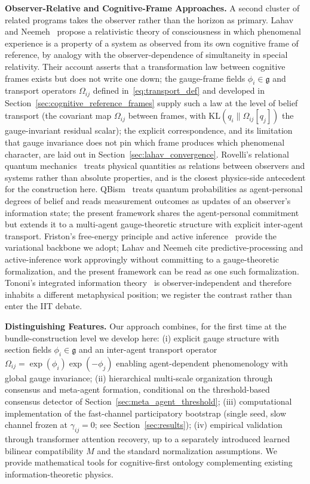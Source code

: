 \documentclass[11pt]{article}
\begin{document}
\textbf{Observer-Relative and Cognitive-Frame Approaches.} A second cluster of related programs takes the observer rather than the horizon as primary. Lahav and Neemeh~\cite{LahavNeemeh2022, LahavNeemeh2025} propose a relativistic theory of consciousness in which phenomenal experience is a property of a system as observed from its own cognitive frame of reference, by analogy with the observer-dependence of simultaneity in special relativity. Their account asserts that a transformation law between cognitive frames exists but does not write one down; the gauge-frame fields $\phi_i \in \mathfrak{g}$ and transport operators $\Omega_{ij}$ defined in~\eqref{eq:transport_def} and developed in Section~\ref{sec:cognitive_reference_frames} supply such a law at the level of belief transport (the covariant map $\Omega_{ij}$ between frames, with $\mathrm{KL}(q_i \| \Omega_{ij}[q_j])$ the gauge-invariant residual scalar); the explicit correspondence, and its limitation that gauge invariance does not pin which frame produces which phenomenal character, are laid out in Section~\ref{sec:lahav_convergence}. Rovelli's relational quantum mechanics~\cite{Rovelli1996} treats physical quantities as relations between observers and systems rather than absolute properties, and is the closest physics-side antecedent for the construction here. QBism~\cite{Fuchs2014} treats quantum probabilities as agent-personal degrees of belief and reads measurement outcomes as updates of an observer's information state; the present framework shares the agent-personal commitment but extends it to a multi-agent gauge-theoretic structure with explicit inter-agent transport. Friston's free-energy principle and active inference~\cite{Friston2010, Friston2017, parr2022active} provide the variational backbone we adopt; Lahav and Neemeh cite predictive-processing and active-inference work approvingly without committing to a gauge-theoretic formalization, and the present framework can be read as one such formalization. Tononi's integrated information theory~\cite{Tononi2008, Tononi2016} is observer-independent and therefore inhabits a different metaphysical position; we register the contrast rather than enter the IIT debate.

\textbf{Distinguishing Features.} Our approach combines, for the first time at the bundle-construction level we develop here: (i) explicit gauge structure with section fields $\phi_i \in \mathfrak{g}$ and an inter-agent transport operator $\Omega_{ij} = \exp(\phi_i)\exp(-\phi_j)$ enabling agent-dependent phenomenology with global gauge invariance; (ii) hierarchical multi-scale organization through consensus and meta-agent formation, conditional on the threshold-based consensus detector of Section~\ref{sec:meta_agent_threshold}; (iii) computational implementation of the fast-channel participatory bootstrap (single seed, slow channel frozen at $\gamma_{ij} = 0$; see Section~\ref{sec:results}); (iv) empirical validation through transformer attention recovery, up to a separately introduced learned bilinear compatibility $M$ and the standard normalization assumptions. We provide mathematical tools for cognitive-first ontology complementing existing information-theoretic physics.
\end{document}
